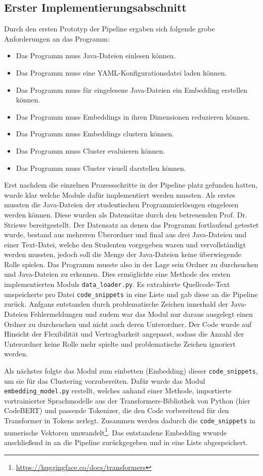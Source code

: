 \subsection{Erster Implementierungsabschnitt}
Durch den ersten Prototyp der Pipeline ergaben sich folgende grobe Anforderungen an das Programm:
\begin{itemize}
    \item Das Programm muss Java-Dateien einlesen können.
    \item Das Programm muss eine YAML-Konfigurationsdatei laden können.
    \item Das Programm muss für eingelesene Java-Dateien ein Embedding erstellen können.
    \item Das Programm muss Embeddings in ihren Dimensionen reduzieren können.
    \item Das Programm muss Embeddings clustern können.
    \item Das Programm muss Cluster evaluieren können.
    \item Das Programm muss Cluster visuell darstellen können.
\end{itemize}
Erst nachdem die einzelnen Prozessschritte in der Pipeline platz gefunden hatten, wurde klar welche Module dafür implementiert werden mussten. Als erstes mussten die Java-Dateien der studentischen Programmierlösugen eingelesen werden können. Diese wurden als Datensätze durch den betreuenden Prof. Dr. Striewe bereitgestellt. Der Datensatz an denen das Programm fortlaufend getestet wurde, bestand aus mehreren Überordner und final aus drei Java-Dateien und einer Text-Datei, welche den Studenten vorgegeben waren und vervollständigt werden mussten, jedoch soll die Menge der Java-Dateien keine überwiegende Rolle spielen. Das Programm musste also in der Lage sein Ordner zu durchsuchen und Java-Dateien zu erkennen. Dies ermöglichte eine Methode des ersten implementierten Moduls \texttt{data\_loader.py}. Es extrahierte Quellcode-Text unspeicherte pro Datei \texttt{code\_snippets} in eine Liste und gab diese an die Pipeline zurück. Anfgans entstanden durch problematische Zeichen innerhald der Java-Dateien Fehlermeldungen und zudem war das Modul nur daraus ausgelegt einen Ordner zu durchsuchen und nicht auch deren Unterordner. Der Code wurde auf Hinsicht der Flexibilität und Vertragbarkeit angepasst, sodass die Anzahl der Unterordner keine Rolle mehr spielte und problematische Zeichen ignoriert werden.

Als nächstes folgte das Modul zum einbetten (Embedding) dieser \texttt{code\_snippets}, um sie für das Clustering vorzubereiten. Dafür wurde das Modul \texttt{embedding\_model.py} erstellt, welches anhand einer Methode, importierte vortrainierter Sprachmodelle aus der Transformers-Bibliothek von Python (hier CodeBERT) und passende Tokenizer, die den Code vorbereitend für den Transformer in Tokens zerlegt. Zusammen werden dadurch die \texttt{code\_snippets} in numerische Vektoren umwandelt\footnote{\url{https://huggingface.co/docs/transformers}}. Das entstandene Embedding wwurde anschließend in an die Pipeline zurückgegeben und in eine Liste abgespeichert.

